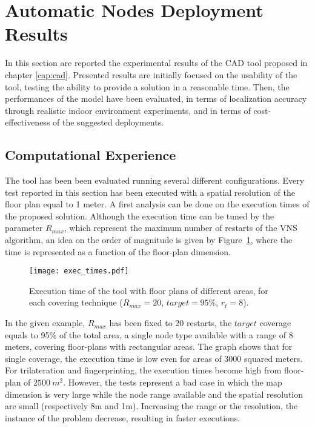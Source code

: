 \section{Automatic Nodes Deployment Results}
\label{sec:CAD-test}

In this section are reported the experimental results of the CAD tool proposed in chapter \ref{cap:cad}.
Presented results are initially focused on the usability of the tool, testing the ability to provide a solution in a reasonable time. Then, the performances of the model have been evaluated, in terms of localization accuracy through realistic indoor environment experiments, and in terms of cost-effectiveness of the suggested deployments.

\subsection{Computational Experience}\label{subsec:comp_res}
The tool has been been evaluated running several different configurations. Every test reported in this section has been executed with a spatial resolution of the floor plan equal to 1 meter.  A first analysis can be done on the execution times of the proposed solution. Although the execution time can be tuned by the parameter $R_{max}$, which represent the maximum number of restarts of the VNS algorithm, an idea on the order of magnitude is given by Figure~\ref{fig:time}, where the time is represented as a function of the floor-plan dimension.
\begin{figure}[h!tb]
\centering\texttt{[image: exec\_times.pdf]}
\caption{Execution time of the tool with floor plans of different areas, for each covering technique ($R_{max} = 20$, $target = 95\%$, $r_t=8$).}
\label{fig:time}
\end{figure}
In the given example, $R_{max}$ has been fixed to 20 restarts, the $target$ coverage equals to 95\% of the total area, a single node type available with a range of 8 meters, covering floor-plans with rectangular areas. The graph shows that for single coverage, the execution time is low even for areas of 3000 squared meters. For trilateration and fingerprinting, the execution times become high from floor-plan of $2500~m^2$. However, the tests represent a bad case in which the map dimension is very large while the node range available and the spatial resolution are small (respectively 8m and 1m). Increasing the range or the resolution, the instance of the problem decrease, resulting in faster executions.

